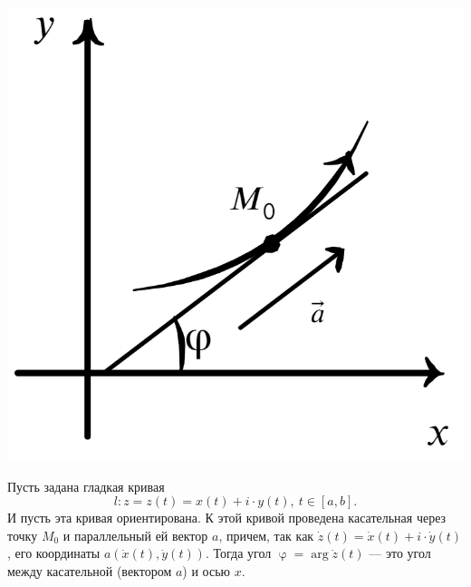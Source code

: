 \documentclass[a4paper, 12pt]{article}
\renewcommand{\varphi}{\upvarphi}
\begin{document}
\parbox[b][5cm][t]{10mm}{
	\includegraphics[scale=0.42]{images/019.png}}
\hfill
\parbox[b][4.5cm][t]{110mm}{Пусть задана гладкая кривая $$l: z= z(t) = x(t) + i\cdot y(t),\ t\in[a,b].$$ И пусть эта кривая ориентирована. К этой кривой проведена касательная через точку $M_0$ и параллельный ей вектор $a$, причем, так как $\dot{z}(t) = \dot{x}(t) + i\cdot \dot{y}(t)$, его координаты $a(\dot{x}(t), \dot y(t))$. Тогда угол $\varphi = \arg \dot z (t)$ --- это угол между касательной (вектором $a$) и осью $x$.}
\end{document}
